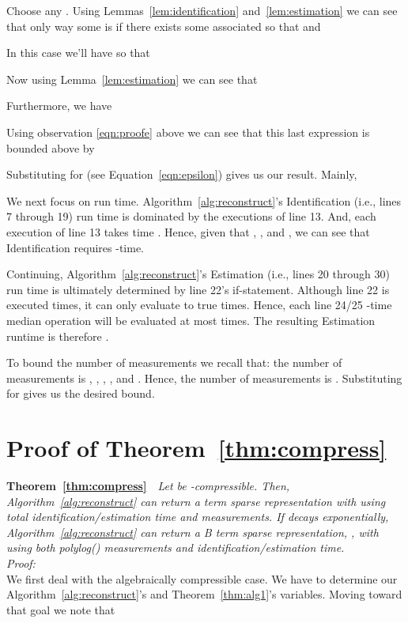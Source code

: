 \documentclass{article}
\begin{document}
Choose any .  Using Lemmas~\ref{lem:identification} and~\ref{lem:estimation} we can see that only way some  is if there exists some associated  so that  and
 
In this case we'll have  so that


Now using Lemma~\ref{lem:estimation} we can see that

Furthermore, we have

Using observation \ref{eqn:proofe} above we can see that this last expression is bounded above by

Substituting for  (see Equation~\ref{eqn:epsilon}) gives us our result.  Mainly,



We next focus on run time.  Algorithm~\ref{alg:reconstruct}'s Identification (i.e., lines 7 through 19) run time is dominated by the  executions of line 13.  And, each execution of line 13 takes time .  Hence, given that , , and , we can see that Identification requires -time.

Continuing, Algorithm~\ref{alg:reconstruct}'s Estimation (i.e., lines 20 through 30) run time is ultimately determined by line 22's {\sc if}-statement.  Although line 22 is executed  times, it can only evaluate to true  times.  Hence, each line 24/25 -time median operation will be evaluated at most  times.  The resulting Estimation runtime is therefore .

To bound the number of measurements we recall that:  the number of measurements is ,  ,  ,  , and  . Hence, the number of measurements is .  Substituting for  gives us the desired bound.
~~ \\

\section{Proof of Theorem~\ref{thm:compress}}

\noindent \textbf{Theorem~\ref{thm:compress}}~~\textit{Let  be -compressible.  Then, Algorithm~\ref{alg:reconstruct} can return a  term sparse representation  with  using  total identification/estimation time and  measurements.  If  decays exponentially, Algorithm~\ref{alg:reconstruct} can return a B term sparse representation, , with  using both  polylog() measurements and identification/estimation time.}\\

\noindent \textit{Proof:} \\

We first deal with the algebraically compressible case.  We have to determine our Algorithm~\ref{alg:reconstruct}'s  and Theorem~\ref{thm:alg1}'s  variables.  Moving toward that goal we note that
\end{document}
